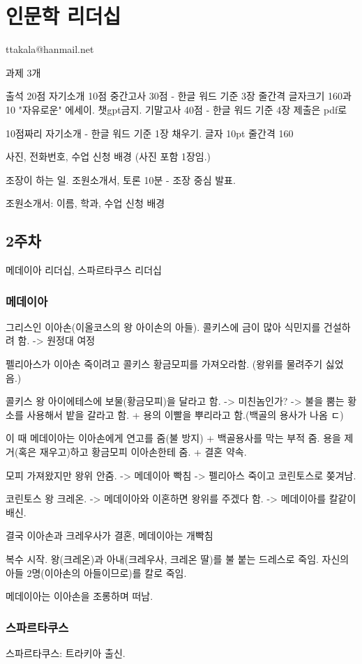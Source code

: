\chapter{인문학 리더십}

ttakala@hanmail.net

과제 3개

출석 20점 자기소개 10점 중간고사 30점 - 한글 워드 기준 3장 줄간격 글자크기 160과
10 "자유로운" 에세이. 챗gpt금지. 기말고사 40점 - 한글 워드 기준 4장 제출은 pdf로

10점짜리 자기소개 - 한글 워드 기준 1장 채우기. 글자 10pt 줄간격 160

사진, 전화번호, 수업 신청 배경 (사진 포함 1장임.)

조장이 하는 일. 조원소개서, 토론 10분 - 조장 중심 발표.

조원소개서: 이름, 학과, 수업 신청 배경

\section{2주차}
메데이아 리더십, 스파르타쿠스 리더십

\subsection{메데이아}
그리스인 이아손(이올코스의 왕 아이손의 아들). 콜키스에 금이 많아 식민지를
건설하려 함. -> 원정대 여정

펠리아스가 이아손 죽이려고 콜키스 황금모피를 가져오라함. (왕위를 물려주기
싫었음.)

콜키스 왕 아이에테스에 보물(황금모피)을 달라고 함. -> 미친놈인가? -> 불을 뿜는
황소를 사용해서 밭을 갈라고 함. + 용의 이빨을 뿌리라고 함.(백골의 용사가 나옴
ㄷ)

이 때 메데이아는 이아손에게 연고를 줌(불 방지) + 백골용사를 막는 부적 줌. 용을
제거(혹은 재우고)하고 황금모피 이아손한테 줌. + 결혼 약속.

모피 가져왔지만 왕위 안줌. -> 메데이아 빡침 -> 펠리아스 죽이고 코린토스로
쫒겨남.

코린토스 왕 크레온. -> 메데이아와 이혼하면 왕위를 주겠다 함. -> 메데이아를
칼같이 배신.

결국 이아손과 크레우사가 결혼, 메데이아는 개빡침 

복수 시작. 왕(크레온)과 아내(크레우사, 크레온 딸)를 불 붙는 드레스로 죽임. 
자신의 아들 2명(이아손의
아들이므로)를 칼로 죽임.

메데이아는 이아손을 조롱하며 떠남.

\subsection{스파르타쿠스}
스파르타쿠스: 트라키아 출신.

